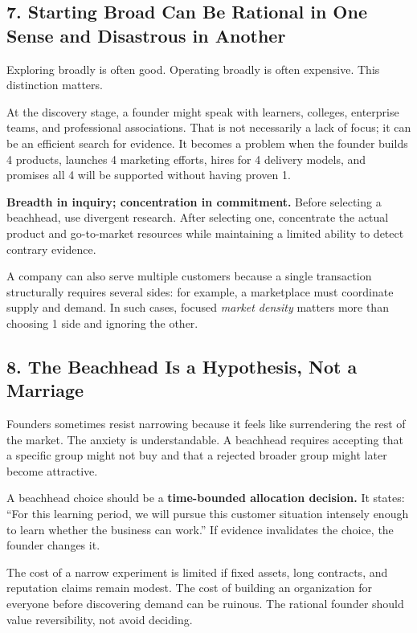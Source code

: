 \subsection*{7. Starting Broad Can Be Rational in One Sense and Disastrous in Another}

Exploring broadly is often good. Operating broadly is often expensive. This distinction matters.

At the discovery stage, a founder might speak with learners, colleges, enterprise teams, and professional associations. That is not necessarily a lack of focus; it can be an efficient search for evidence. It becomes a problem when the founder builds 4 products, launches 4 marketing efforts, hires for 4 delivery models, and promises all 4 will be supported without having proven 1.

\textbf{Breadth in inquiry; concentration in commitment.} Before selecting a beachhead, use divergent research. After selecting one, concentrate the actual product and go-to-market resources while maintaining a limited ability to detect contrary evidence.

A company can also serve multiple customers because a single transaction structurally requires several sides: for example, a marketplace must coordinate supply and demand. In such cases, focused \emph{market density} matters more than choosing 1 side and ignoring the other.

\subsection*{8. The Beachhead Is a Hypothesis, Not a Marriage}

Founders sometimes resist narrowing because it feels like surrendering the rest of the market. The anxiety is understandable. A beachhead requires accepting that a specific group might not buy and that a rejected broader group might later become attractive.

A beachhead choice should be a \textbf{time-bounded allocation decision.} It states: ``For this learning period, we will pursue this customer situation intensely enough to learn whether the business can work.'' If evidence invalidates the choice, the founder changes it.

The cost of a narrow experiment is limited if fixed assets, long contracts, and reputation claims remain modest. The cost of building an organization for everyone before discovering demand can be ruinous. The rational founder should value reversibility, not avoid deciding.

